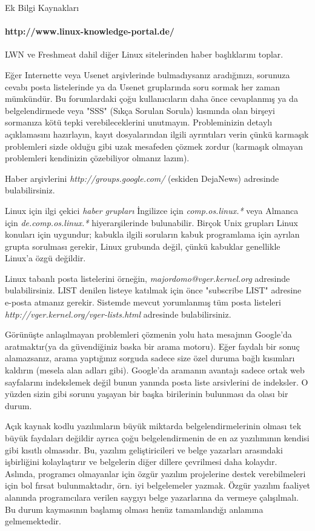 \begin{section}{Ek Bilgi Kaynakları}
\paragraph{http://www.linux-knowledge-portal.de/}{LWN ve Freshmeat dahil diğer Linux sitelerinden haber başlıklarını toplar.}

Eğer Internette veya Usenet arşivlerinde bulmadıysanız aradığınızı, sorunuza cevabı  posta listelerinde ya da Usenet gruplarında soru sormak her zaman mümkündür. Bu forumlardaki çoğu kullanıcıların daha önce cevaplanmış ya da belgelendirmede veya "SSS" (Sıkça Sorulan Sorula) kısmında olan birşeyi sormanıza kötü tepki verebileceklerini unutmayın. Probleminizin detaylı açıklamasını hazırlayın, kayıt dosyalarından ilgili ayrıntıları verin çünkü karmaşık problemleri sizde olduğu gibi uzak mesafeden çözmek zordur (karmaşık olmayan problemleri kendinizin çözebiliyor olmanız lazım).

Haber arşivlerini \emph{http://groups.google.com/} (eskiden DejaNews) adresinde bulabilirsiniz.

Linux için ilgi çekici \emph{haber grupları} İngilizce için \emph{comp.os.linux.*} veya Almanca için \emph{de.comp.os.linux.*} hiyerarşilerinde bulunabilir. Birçok Unix grupları Linux konuları için uygundur; kabukla ilgili soruların kabuk programlama için ayrılan grupta sorulması gerekir, Linux grubunda değil, çünkü kabuklar genellikle Linux'a özgü değildir.

Linux tabanlı posta listelerini örneğin, \emph{majordomo@vger.kernel.org} adresinde bulabilirsiniz. LIST denilen listeye katılmak için önce "subscribe LIST" adresine e-posta atmanız gerekir. Sistemde mevcut yorumlanmış tüm posta listeleri \emph{http://vger.kernel.org/vger-lists.html} adresinde bulabilirsiniz.

Görünüşte anlaşılmayan problemleri çözmenin yolu hata mesajının Google'da aratmaktır(ya da güvendiğiniz baska bir arama motoru). Eğer faydalı bir sonuç alamazsanız, arama yaptığınız sorguda sadece size özel duruma bağlı kısımları kaldırın (mesela alan adları gibi). Google'da aramanın avantajı sadece ortak web sayfalarını indekslemek değil bunun yanında posta liste arsivlerini de indeksler. O yüzden sizin gibi sorunu yaşayan bir başka birilerinin bulunması da olası bir durum.

Açık kaynak kodlu yazılımların büyük miktarda belgelendirmelerinin olması tek büyük faydaları değildir ayrıca çoğu belgelendirmenin de en az yazılımının kendisi gibi kısıtlı olmasıdır. Bu, yazılım geliştiricileri ve belge yazarları arasındaki işbirliğini kolaylaştırır ve belgelerin diğer dillere çevrilmesi daha kolaydır. Aslında, programcı olmayanlar için özgür yazılım projelerine destek verebilmeleri için bol fırsat bulunmaktadır, örn. iyi belgelemeler yazmak. Özgür yazılım faaliyet alanında programcılara verilen saygıyı belge yazarlarına da vermeye çalışılmalı. Bu durum kaymasının başlamış olması henüz tamamlandığı anlamına gelmemektedir.
\end{section}

